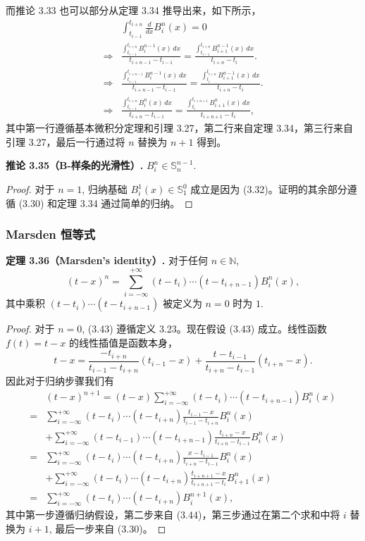 \documentclass[a4paper]{ctexart}
\begin{document}
{而推论 3.33 也可以部分从定理 3.34 推导出来，如下所示，
\begin{align*}
&\int_{t_{i-1}}^{t_{i+n}} \frac{d}{dx} B_{i}^{n}(x) = 0 \\
\Rightarrow &\frac{\int_{t_{i-1}}^{t_{i+n}} B_{i}^{n-1}(x) \, dx}{t_{i+n-1} - t_{i-1}} = \frac{\int_{t_{i-1}}^{t_{i+n}} B_{i+1}^{n-1}(x) \, dx}{t_{i+n} - t_{i}}. \\
\Rightarrow &\frac{\int_{t_{i-1}}^{t_{i+n-1}} B_{i}^{n-1}(x) \, dx}{t_{i+n-1} - t_{i-1}} = \frac{\int_{t_{i}}^{t_{i+n}} B_{i+1}^{n-1}(x) \, dx}{t_{i+n} - t_{i}}. \\
\Rightarrow &\frac{\int_{t_{i-1}}^{t_{i+n}} B_{i}^{n}(x) \, dx}{t_{i+n} - t_{i-1}} = \frac{\int_{t_{i}}^{t_{i+n+1}} B_{i+1}^{n}(x) \, dx}{t_{i+n+1} - t_{i}},
\end{align*}
其中第一行遵循基本微积分定理和引理 3.27，第二行来自定理 3.34，第三行来自引理 3.27，最后一行通过将 $n$ 替换为 $n+1$ 得到。

\noindent \textbf{推论 3.35（B-样条的光滑性）.} $B_{i}^{n} \in \mathbb{S}_{n}^{n-1}$.

\begin{proof}
对于 $n = 1$, 归纳基础 $B_{i}^{1}(x) \in \mathbb{S}_{1}^{0}$ 成立是因为 (3.32)。证明的其余部分遵循 (3.30) 和定理 3.34 通过简单的归纳。
\end{proof} 

\subsubsection{Marsden 恒等式}

\noindent \textbf{定理 3.36（Marsden's identity）.} 对于任何 $n \in \mathbb{N}$, 
\[
(t-x)^n = \sum_{i=-\infty}^{+\infty} (t-t_i) \cdots(t-t_{i+n-1}) B_i^n(x), \tag{3.43}
\]
其中乘积 $(t - t_i) \cdots(t - t_{i + n - 1})$ 被定义为 $n = 0$ 时为 $1$.

\begin{proof}
对于 $n = 0$, (3.43) 遵循定义 3.23。现在假设 (3.43) 成立。线性函数 $f(t)=t - x$ 的线性插值是函数本身，
\[
  t-x = \frac{-t_{i+n}}{t_{i-1}-t_{i+n}}(t_{i-1}-x) + \frac{t-t_{i-1}}{t_{i+n}-t_{i-1}}(t_{i+n}-x). \tag{3.44}
\]
因此对于归纳步骤我们有
\begin{align*}
  &(t-x)^{n+1} = (t-x) \sum_{i=-\infty}^{+\infty} (t-t_i) \cdots(t-t_{i+n-1}) B_i^n(x) \\
  =& \sum_{i=-\infty}^{+\infty} (t-t_i) \cdots(t-t_{i+n}) \frac{t_{i-1}-x}{t_{i-1}-t_{i+n}} B_i^n(x) \\
  &+ \sum_{i=-\infty}^{+\infty} (t-t_{i-1}) \cdots(t-t_{i+n-1}) \frac{t_{i+n}-x}{t_{i+n}-t_{i-1}} B_i^n(x) \\
  =& \sum_{i=-\infty}^{+\infty} (t-t_i) \cdots(t-t_{i+n}) \frac{x-t_{i-1}}{t_{i+n}-t_{i-1}} B_i^n(x) \\
  &+ \sum_{i=-\infty}^{+\infty} (t-t_i) \cdots(t-t_{i+n}) \frac{t_{i+n+1}-x}{t_{i+n+1}-t_i} B_{i+1}^n(x) \\
  =& \sum_{i=-\infty}^{+\infty} (t-t_i) \cdots(t-t_{i+n}) B_i^{n+1}(x),
\end{align*}
其中第一步遵循归纳假设，第二步来自 (3.44)，第三步通过在第二个求和中将 $i$ 替换为 $i+1$, 最后一步来自 (3.30)。    
\end{proof}

}
\end{document}

